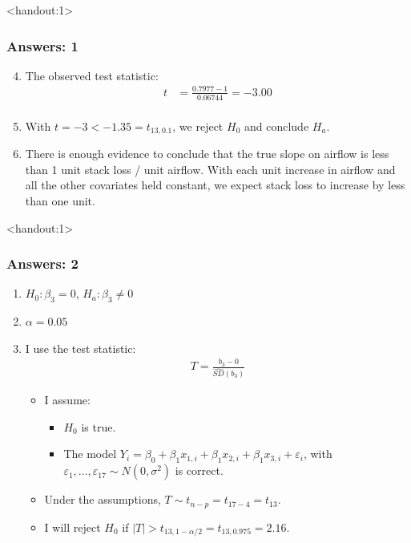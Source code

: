 \documentclass[handout]{beamer}\usepackage[]{graphicx}\usepackage[]{color}
\newcommand{\answers}{1}
\providecommand{\e}{\varepsilon}
\providecommand{\wh}[1]{\widehat{#1}}
\numberwithin{equation}{section}
\begin{document}
\begin{frame}<handout:\answers>
\frametitle{Answers: 1} \small
\begin{enumerate}
\setcounter{enumi}{3}
\item The observed test statistic:
\pause \begin{align*}
t &= \frac{0.7977 - 1}{0.06744} = -3.00 \\
\end{align*}
\pause \item With $t = -3 <  -1.35 = t_{13, 0.1}$, we reject $H_0$ and conclude $H_a$.
\pause \item There is enough evidence to conclude that the true slope on airflow is less than 1 unit stack loss / unit airflow. With each unit increase in airflow and all the other covariates held constant, we expect stack loss to increase by less than one unit.
\end{enumerate}
\end{frame}





\begin{frame}<handout:\answers>
\frametitle{Answers: 2}
\begin{enumerate}[1. ]
\item $H_0: \beta_3 = 0$, $H_a: \beta_3 \ne 0$
\pause \item $\alpha = 0.05$
\pause \item I use the test statistic:
\pause \begin{align*}
T = \frac{b_3 - 0}{\wh{SD}(b_3)}
\end{align*}
\begin{itemize}
\pause \item I assume:
\begin{itemize}
\pause \item $H_0$ is true.
\pause \item The model $Y_i = \beta_0 + \beta_1 x_{1, i} + \beta_1 x_{2, i} + \beta_1 x_{3, i} + \e_i$, with $\e_1, \ldots, \e_{17} \sim N(0, \sigma^2)$ is correct.
\end{itemize}
\pause \item Under the assumptions, $T \sim t_{n - p} = t_{17 - 4} = t_{13}$.
\pause \item I will reject $H_0$ if $|T| >  t_{13, 1 - \alpha/2} = t_{13, 0.975} = 2.16$.
\end{itemize}
\end{enumerate}
\end{frame}
\end{document}
